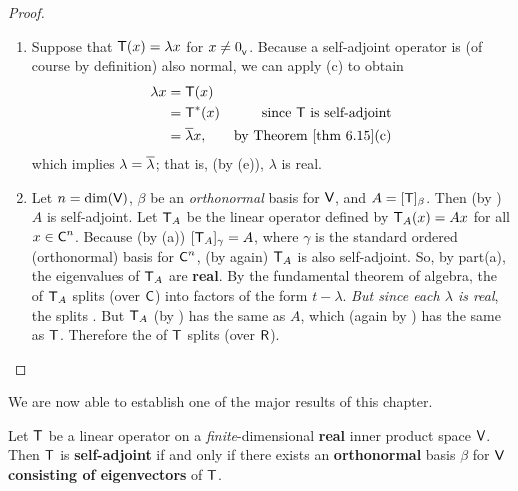 \begin{proof} \ 

\begin{enumerate}
\item Suppose that \(\textsf{T}(x) = \lambda x\) for \(x \ne 0_{_{\textsf{V}}}\).
Because a self-adjoint operator is (of course by definition) also normal, we can apply (c) to obtain
\begin{align*}
    \lambda x & = \T(x) \\
        & = \T^*(x) & \text{since \(\T\) is self-adjoint} \\
        & = \conjugatet{\lambda} x, & \text{by \THM{6.15}(c)}
\end{align*}
which implies \(\lambda = \overline{\lambda}\);
that is, (by (e)), \(\lambda\) is real.

\item Let \(n = \dim(\textsf{V})\), \(\beta\) be an \emph{orthonormal} basis for \(\textsf{V}\), and \(A = [\textsf{T}]_{\beta}\).
Then (by ) \(A\) is self-adjoint.
Let \(\textsf{T}_A\) be the linear operator  defined by \(\textsf{T}_A(x) = Ax\) for all \(x \in \textsf{C}^n\).
Because (by (a)) \([\textsf{T}_A]_{\gamma} = A\), where \(\gamma\) is the standard ordered (orthonormal) basis for \(\textsf{C}^n\), (by  again) \(\textsf{T}_A\) is also self-adjoint.
So, by part(a), the eigenvalues of \(\textsf{T}_A\) are \textbf{real}.
By the fundamental theorem of algebra, the
\CPOLY{} of \(\textsf{T}_A\) splits (over \(\textsf{C}\)) into factors of the form \(t - \lambda\).
\emph{But since each \(\lambda\) is real}, the \CPOLY{} splits .
But \(\textsf{T}_A\) (by ) has the same \CPOLY{} as \(A\), which (again by ) has the same \CPOLY{} as \(\textsf{T}\).
Therefore the \CPOLY{} of \(\textsf{T}\) splits (over \(\textsf{R}\)).
\end{enumerate}
\end{proof}

We are now able to establish one of the major results of this chapter.

\begin{theorem} \label{thm 6.17}
Let \(\textsf{T}\) be a linear operator on a \emph{finite}-dimensional \textbf{real} inner product space \(\textsf{V}\).
Then \(\textsf{T}\) is \textbf{self-adjoint} if and only if there exists an \textbf{orthonormal} basis \(\beta\) for \(\textsf{V}\) \textbf{consisting of eigenvectors} of \(\textsf{T}\).
\end{theorem}

